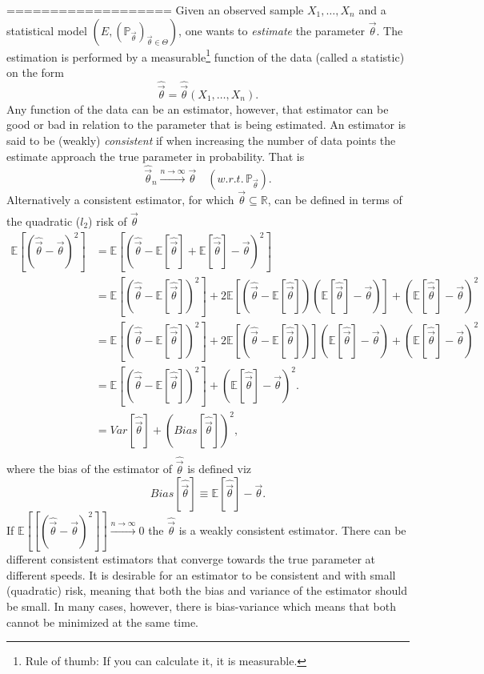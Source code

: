 ===================
Given an observed sample $X_1,\dots, X_n$ and a statistical model $(E,(\mathbb{P}_{\vec{\theta}})_{\vec{\theta}\in \Theta})$, one wants to \emph{estimate} the parameter $\vec{\theta}$. The estimation is performed by a measurable\footnote{Rule of thumb: If you can calculate it, it is measurable.} function of the data (called a statistic) on the form
\begin{equation}
	\hat{\vec{\theta}}=\hat{\vec{\theta}}(X_1,\dots, X_n).
\end{equation}
Any function of the data can be an estimator, however, that estimator can be good or bad in relation to the parameter that is being estimated. An estimator is said to be (weakly) \emph{consistent} if when increasing the number of data points the estimate approach the true parameter in probability. That is
\begin{equation}
	\hat{\vec{\theta}}_n\xrightarrow[]{n\rightarrow\infty}\vec{\theta} \quad (w.r.t. \, \mathbb{P}_{\vec{\theta}}).
\end{equation}
Alternatively a consistent estimator, for which $\vec{\theta}\subseteq \mathbb{R}$, can be defined in terms of the quadratic ($l_2$) risk of $\hat{\vec{\theta}}$ 
\begin{equation}
	\begin{split}
		\mathbb{E}[(\hat{\vec{\theta}}-\vec{\theta})^2]&=\mathbb{E}[(\hat{\vec{\theta}}-\mathbb{E}[\hat{\vec{\theta}}]+\mathbb{E}[\hat{\vec{\theta}}]-\vec{\theta})^2]\\
		&=\mathbb{E}[(\hat{\vec{\theta}}-\mathbb{E}[\hat{\vec{\theta}}])^2]+2\mathbb{E}[(\hat{\vec{\theta}}-\mathbb{E}[\hat{\vec{\theta}}])(\mathbb{E}[\hat{\vec{\theta}}]-\vec{\theta})]+(\mathbb{E}[\hat{\vec{\theta}}]-\vec{\theta})^2\\
		&=\mathbb{E}[(\hat{\vec{\theta}}-\mathbb{E}[\hat{\vec{\theta}}])^2]+2{\mathbb{E}[(\hat{\vec{\theta}}-\mathbb{E}[\hat{\vec{\theta}}])]}(\mathbb{E}[\hat{\vec{\theta}}]-\vec{\theta})+(\mathbb{E}[\hat{\vec{\theta}}]-\vec{\theta})^2\\
		&=\mathbb{E}[(\hat{\vec{\theta}}-\mathbb{E}[\hat{\vec{\theta}}])^2]+(\mathbb{E}[\hat{\vec{\theta}}]-\vec{\theta})^2.\\
		&=Var[\hat{\vec{\theta}}]+(Bias[\hat{\vec{\theta}}])^2,\\
	\end{split}
\end{equation}
where the bias of the estimator of $\hat{\vec{\theta}}$ is defined viz
\begin{equation}
	Bias[\hat{\vec{\theta}}]\equiv \mathbb{E}[\hat{\vec{\theta}}]-\vec{\theta}.
\end{equation}
If $\mathbb{E}[[(\hat{\vec{\theta}}-\vec{\theta})^2]]\xrightarrow[]{n\rightarrow\infty} 0$ the $\hat{\vec{\theta}}$ is a weakly consistent estimator. There can be different consistent estimators that converge towards the true parameter at different speeds. It is desirable for an estimator to be consistent and with small (quadratic) risk, meaning that both the bias and variance of the estimator should be small. In many cases, however, there is bias-variance which means that both cannot be minimized at the same time. 

